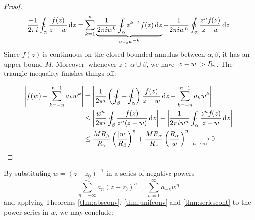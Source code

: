 \begin{proof}
\begin{gather*}
\frac{-1}{2\pi i}\oint_\alpha\frac{f(z)}{z-w}\,{\mathrm{d} z} =\sum_{k=1}^{n}\underbrace{\frac 1{2\pi iw^k}\oint_\alpha z^{k-1}f(z)\,{\mathrm{d} z}}_{a_{-k}w^{-k}} -\frac 1{2\pi iw^n}\oint_\alpha \frac{z^nf(z)}{z-w}\,{\mathrm{d} z}
\end{gather*}
Since $f(z)$ is continuous on the closed bounded annulus between $\alpha,\beta$, it has an upper bound $M$. Moreover, whenever $z\in\alpha\cup\beta$, we have $\nm{z-w}>R_\gamma$. The triangle inequality finishes things off:

\begin{align*}
\left| f(w)-\sum_{k=-n}^{n-1}a_kw^k\right|& =\left| \frac 1{2\pi i}\left(\oint_\beta-\oint_\alpha\right)\frac{f(z)}{z-w}\,{\mathrm{d} z}-\sum_{k=-n}^{n-1}a_kw^k\right|\\
&\le \left| \frac{w^n}{2\pi i}\oint_\beta \frac{f(z)}{z^n(z-w)}\,{\mathrm{d} z}\right|+\left| \frac 1{2\pi iw^n}\oint_\alpha \frac{z^nf(z)}{z-w}\,{\mathrm{d} z}\right|\\
&\le\frac{MR_\beta}{R_\gamma}\left(\frac{\left| w\right|}{R_\beta}\right)^n +\frac{MR_\alpha}{R_\gamma}\left(\frac{R_\alpha}{\left| w\right|}\right)^n \xrightarrow[n\to\infty]{} 0\tag*{\qedhere}
\end{align*}
\end{proof}
\goodbreak

By substituting $w=(z-z_0)^{-1}$ in a series of negative powers
\[\sum\limits_{n=-\infty}^{-1} a_n(z-z_0)^n=\sum\limits_{n=1}^\infty a_{-n}w^n\]
and applying Theorems \ref{thm:absconv}, \ref{thm:unifconv} and \ref{thm:seriescont} to the power series in $w$, we may conclude:


